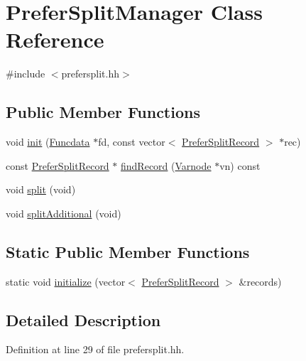 \hypertarget{class_prefer_split_manager}{}\section{Prefer\+Split\+Manager Class Reference}
\label{class_prefer_split_manager}


{\ttfamily \#include $<$prefersplit.\+hh$>$}

\subsection*{Public Member Functions}
\begin{DoxyCompactItemize}
\item 
void \mbox{\hyperlink{class_prefer_split_manager_a7b6c7e6e278991eacbf55cc6fe42ae30}{init}} (\mbox{\hyperlink{class_funcdata}{Funcdata}} $\ast$fd, const vector$<$ \mbox{\hyperlink{struct_prefer_split_record}{Prefer\+Split\+Record}} $>$ $\ast$rec)
\item 
const \mbox{\hyperlink{struct_prefer_split_record}{Prefer\+Split\+Record}} $\ast$ \mbox{\hyperlink{class_prefer_split_manager_a088b679b11edf784a3660808c42d6de3}{find\+Record}} (\mbox{\hyperlink{class_varnode}{Varnode}} $\ast$vn) const
\item 
void \mbox{\hyperlink{class_prefer_split_manager_ac57104c8f58add45abec3119b2e89fee}{split}} (void)
\item 
void \mbox{\hyperlink{class_prefer_split_manager_a9b4943224f9764638eca4789f834913a}{split\+Additional}} (void)
\end{DoxyCompactItemize}
\subsection*{Static Public Member Functions}
\begin{DoxyCompactItemize}
\item 
static void \mbox{\hyperlink{class_prefer_split_manager_a46f56b65a228ce558bc98c307f17f4ef}{initialize}} (vector$<$ \mbox{\hyperlink{struct_prefer_split_record}{Prefer\+Split\+Record}} $>$ \&records)
\end{DoxyCompactItemize}


\subsection{Detailed Description}


Definition at line 29 of file prefersplit.\+hh.



